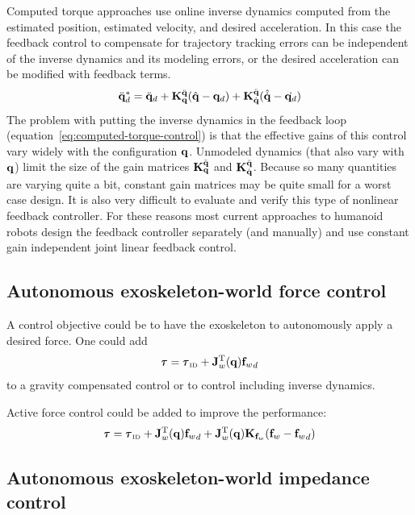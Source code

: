 \documentclass[letterpaper,12pt,fullpage]{article}
\newcommand{\invdyn}{{\mbox {\tiny ID}}}
\begin{document}
Computed torque approaches use online inverse dynamics computed from the estimated
position, estimated velocity, and desired acceleration.
In this case the feedback control to compensate for trajectory tracking errors can
be independent of the inverse dynamics and its modeling errors, or the desired
acceleration can be modified with feedback terms.
\begin{equation}
\ddot{{\bf q}}_d^* = \ddot{{\bf q}}_{d} + {\bf K}_{{\bf q}}^{\ddot{{\bf q}}} ( \hat{{\bf q}} - {\bf q}_d ) 
+ {\bf K}_{\dot{{\bf q}}}^{\ddot{{\bf q}}} ( \hat{\dot{{\bf q}}} - \dot{{\bf q}_d} )
\label{eq:computed-torque-control}
\end{equation}
The problem with putting the inverse dynamics in the feedback loop 
(equation~\ref{eq:computed-torque-control})
is that the
effective gains of this control vary widely with the configuration ${\bf q}$.
Unmodeled dynamics (that also vary with ${\bf q}$) limit the size of the gain matrices
${\bf K}_{{\bf q}}^{\ddot{{\bf q}}}$ and ${\bf K}_{\dot{{\bf q}}}^{\ddot{{\bf q}}}$. Because so many quantities
are varying quite a bit, constant gain matrices may be quite small for a worst case
design. It is also very difficult to evaluate and 
verify this type of nonlinear feedback controller.
For these reasons most current approaches to humanoid
robots design the feedback controller
separately (and manually) 
and use constant gain independent joint linear feedback control.

\subsection{Autonomous exoskeleton-world force control}

A control objective could be to have the exoskeleton to autonomously
apply a desired force.
One could add
\begin{equation}
\vtau = \vtau_{\invdyn} + \mJ_w^{\tr}(\vq) {\vf_w}_d
\end{equation}
to a gravity compensated control or to control including inverse dynamics.

Active force control could be added to improve the performance:
\begin{equation}
\vtau = \vtau_{\invdyn} + \mJ_w^{\tr}(\vq) {\vf_w}_d + \mJ_w^{\tr}(\vq) \mK_{\vf_w} (\vf_w - {\vf_w}_d)
\end{equation}

\subsection{Autonomous exoskeleton-world impedance control}
\label{sec:impw}
\end{document}
